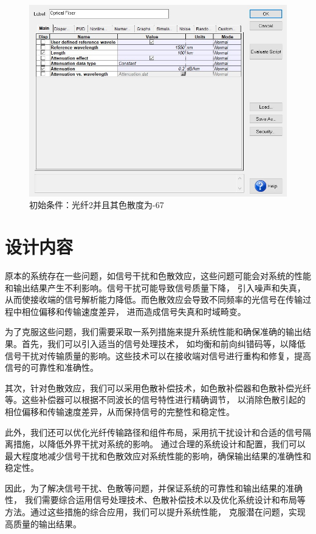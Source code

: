 \documentclass[12pt]{article}
\begin{document}
\begin{figure}[H]
  \centering
  \includegraphics[width=13cm]{figure5.png}
  \caption{初始条件：光纤2并且其色散度为-67}
\end{figure}


\clearpage
\section{设计内容}

原本的系统存在一些问题，如信号干扰和色散效应，这些问题可能会对系统的性能和输出结果产生不利影响。信号干扰可能导致信号质量下降，
引入噪声和失真，从而使接收端的信号解析能力降低。而色散效应会导致不同频率的光信号在传输过程中相位偏移和传输速度差异，
进而造成信号失真和时域畸变。

为了克服这些问题，我们需要采取一系列措施来提升系统性能和确保准确的输出结果。首先，我们可以引入适当的信号处理技术，
如均衡和前向纠错码等，以降低信号干扰对传输质量的影响。这些技术可以在接收端对信号进行重构和修复，提高信号的可靠性和准确性。

其次，针对色散效应，我们可以采用色散补偿技术，如色散补偿器和色散补偿光纤等。这些补偿器可以根据不同波长的信号特性进行精确调节，
以消除色散引起的相位偏移和传输速度差异，从而保持信号的完整性和稳定性。

此外，我们还可以优化光纤传输路径和组件布局，采用抗干扰设计和合适的信号隔离措施，以降低外界干扰对系统的影响。
通过合理的系统设计和配置，我们可以最大程度地减少信号干扰和色散效应对系统性能的影响，确保输出结果的准确性和稳定性。

因此，为了解决信号干扰、色散等问题，并保证系统的可靠性和输出结果的准确性，
我们需要综合运用信号处理技术、色散补偿技术以及优化系统设计和布局等方法。通过这些措施的综合应用，我们可以提升系统性能，
克服潜在问题，实现高质量的输出结果。
\end{document}

